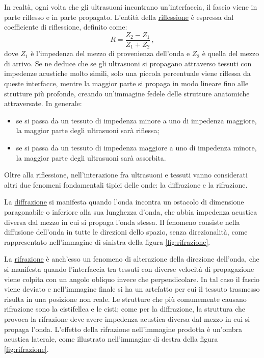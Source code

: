 \documentclass{report}
\newcommand{\figref}[1]{figura \ref{#1}}
\numberwithin{equation}{section}
\numberwithin{figure}{section}
\begin{document}
In realtà, ogni volta che gli ultrasuoni incontrano un’interfaccia, il fascio viene in parte riflesso e in parte propagato. L’entità della \underline{riflessione} è espressa dal coefficiente di riflessione, definito come:
\begin{equation}
    R = \frac{Z_2-Z_1}{Z_1+Z_2}\,,
\end{equation}
dove $Z_1$ è l'impedenza del mezzo di provenienza dell'onda e $Z_2$ è quella del mezzo di arrivo. Se ne deduce che se gli ultrasuoni si propagano attraverso tessuti con impedenze acustiche molto simili, solo una piccola percentuale viene riflessa da queste interfacce, mentre la maggior parte si propaga in modo lineare fino alle strutture più profonde, creando un’immagine fedele delle strutture anatomiche attraversate. In generale:
\begin{itemize}[label=$-$]
    \item se si passa da un tessuto di impedenza minore a uno di impedenza maggiore, la maggior parte degli ultrasuoni sarà riflessa;
    \item se si passa da un tessuto di impedenza maggiore a uno di impedenza minore, la maggior parte degli ultrasuoni sarà assorbita.
\end{itemize}

Oltre alla riflessione, nell'interazione fra ultrasuoni e tessuti vanno considerati altri due fenomeni fondamentali tipici delle onde: la diffrazione e la rifrazione.

La \underline{diffrazione} si manifesta quando l'onda incontra un ostacolo di dimensione paragonabile o inferiore alla sua lunghezza d'onda, che abbia impedenza acustica diversa dal mezzo in cui si propaga l'onda stessa. Il fenomeno consiste nella diffusione dell'onda in tutte le direzioni dello spazio, senza direzionalità, come rappresentato nell'immagine di sinistra della \figref{fig:rifrazione}.

La \underline{rifrazione} è anch'esso un fenomeno di alterazione della direzione dell'onda, che si manifesta quando l’interfaccia tra tessuti con diverse velocità di propagazione viene colpita con un angolo obliquo invece che perpendicolare. In tal caso il fascio viene deviato e nell'immagine finale si ha un artefatto per cui il tessuto trasmesso risulta in una posizione non reale. Le strutture che più comunemente causano rifrazione sono la cistifellea e le cisti; come per la diffrazione, la struttura che provoca la rifrazione deve avere impedenza acustica diversa dal mezzo in cui si propaga l'onda. L'effetto della rifrazione nell'immagine prodotta è un'ombra acustica laterale, come illustrato nell'immagine di destra della \figref{fig:rifrazione}.
\end{document}

